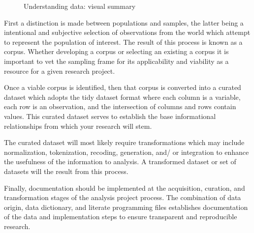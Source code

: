 \documentclass[
  letterpaper,
]{latex/krantz}
\theoremstyle{definition}
\theoremstyle{remark}
\begin{document}
\begin{figure}[H]


\caption{\label{fig-understanding-data-vis-sum}Understanding data:
visual summary}

\end{figure}%

First a distinction is made between populations and samples, the latter
being a intentional and subjective selection of observations from the
world which attempt to represent the population of interest. The result
of this process is known as a corpus. Whether developing a corpus or
selecting an existing a corpus it is important to vet the sampling frame
for its applicability and viability as a resource for a given research
project.

Once a viable corpus is identified, then that corpus is converted into a
curated dataset which adopts the tidy dataset format where each column
is a variable, each row is an observation, and the intersection of
columns and rows contain values. This curated dataset serves to
establish the base informational relationships from which your research
will stem.

The curated dataset will most likely require transformations which may
include normalization, tokenization, recoding, generation, and/ or
integration to enhance the usefulness of the information to analysis. A
transformed dataset or set of datasets will the result from this
process.

Finally, documentation should be implemented at the acquisition,
curation, and transformation stages of the analysis project process. The
combination of data origin, data dictionary, and literate programming
files establishes documentation of the data and implementation steps to
ensure transparent and reproducible research.
\end{document}
